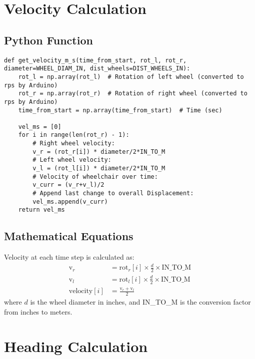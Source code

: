\documentclass{article}
\begin{document}
\section{Velocity Calculation}

\subsection{Python Function}
\begin{lstlisting}
def get_velocity_m_s(time_from_start, rot_l, rot_r, diameter=WHEEL_DIAM_IN, dist_wheels=DIST_WHEELS_IN):
    rot_l = np.array(rot_l)  # Rotation of left wheel (converted to rps by Arduino)
    rot_r = np.array(rot_r)  # Rotation of right wheel (converted to rps by Arduino)
    time_from_start = np.array(time_from_start)  # Time (sec)

    vel_ms = [0]
    for i in range(len(rot_r) - 1):
        # Right wheel velocity:
        v_r = (rot_r[i]) * diameter/2*IN_TO_M
        # Left wheel velocity:
        v_l = (rot_l[i]) * diameter/2*IN_TO_M
        # Velocity of wheelchair over time:
        v_curr = (v_r+v_l)/2
        # Append last change to overall Displacement:
        vel_ms.append(v_curr)
    return vel_ms
\end{lstlisting}

\subsection{Mathematical Equations}
Velocity at each time step is calculated as:
\begin{align*}
\text{v}_r &= \text{rot}_r[i] \times \frac{d}{2} \times \text{IN\_TO\_M} \\
\text{v}_l &= \text{rot}_l[i] \times \frac{d}{2} \times \text{IN\_TO\_M} \\
\text{velocity}[i] &= \frac{\text{v}_r + \text{v}_l}{2}
\end{align*}
where $d$ is the wheel diameter in inches, and IN\_TO\_M is the conversion factor from inches to meters.

\section{Heading Calculation}
\end{document}
